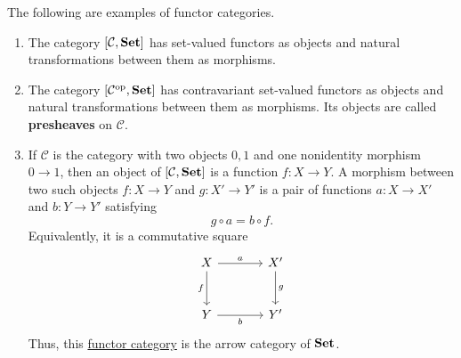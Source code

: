 	\begin{example}
	  \label{ex:functor-categories}
		The following are examples of functor categories.
		\begin{enumerate}
			\item The category $[\mathcal C,\operatorname{\mathbf{Set}}]$ has set-valued
				functors as objects and natural transformations
				between them as morphisms.

			\item The category $[\mathcal C^{\mathrm{op}},\operatorname{\mathbf{Set}}]$
				has contravariant set-valued functors as objects
				and natural transformations between them as
				morphisms. Its objects are called
				\textbf{presheaves} on $\mathcal C$.

			\item If $\mathcal C$ is the category with two objects
				$0,1$ and one nonidentity morphism $0\to1$,
				then an object of $[\mathcal C,\operatorname{\mathbf{Set}}]$ is a function
				$f:X\to Y$. A morphism between two such objects
				$f:X\to Y$ and $g:X'\to Y'$ is a pair of functions
				$a:X\to X'$ and $b:Y\to Y'$ satisfying
				\begin{equation}
					g\circ a=b\circ f.
				\end{equation}
				Equivalently, it is a commutative square
				\begin{equation}
					\begin{tikzcd}[row sep=large, column sep=large]
						X \arrow[r, "a"] \arrow[d, "f"'] &
						X' \arrow[d, "g"] \\
						Y \arrow[r, "b"'] & Y'
					\end{tikzcd}
				\end{equation}
				Thus, this \hyperref[def:functor-category]{functor category} is the arrow
				category of $\operatorname{\mathbf{Set}}$.
		\end{enumerate}
	\end{example}


